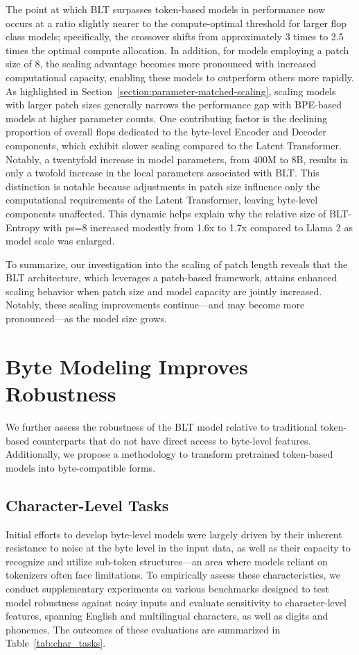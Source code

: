 The point at which {\textsc BLT} surpasses token-based models in performance now occurs at a ratio slightly nearer to the compute-optimal threshold for larger flop class models; specifically, the crossover shifts from approximately 3 times to 2.5 times the optimal compute allocation. In addition, for models employing a patch size of 8, the scaling advantage becomes more pronounced with increased computational capacity, enabling these models to outperform others more rapidly. As highlighted in Section~\ref{section:parameter-matched-scaling}, scaling models with larger patch sizes generally narrows the performance gap with BPE-based models at higher parameter counts. One contributing factor is the declining proportion of overall flops dedicated to the byte-level Encoder and Decoder components, which exhibit slower scaling compared to the Latent Transformer. Notably, a twentyfold increase in model parameters, from 400M to 8B, results in only a twofold increase in the local parameters associated with {\textsc BLT}. This distinction is notable because adjustments in patch size influence only the computational requirements of the Latent Transformer, leaving byte-level components unaffected. This dynamic helps explain why the relative size of {\textsc BLT}-Entropy with ps=8 increased modestly from 1.6x to 1.7x compared to Llama 2 as model scale was enlarged.

To summarize, our investigation into the scaling of patch length reveals that the {\textsc BLT} architecture, which leverages a patch-based framework, attains enhanced scaling behavior when patch size and model capacity are jointly increased. Notably, these scaling improvements continue—and may become more pronounced—as the model size grows.

\section{Byte Modeling Improves Robustness}
We further assess the robustness of the {\textsc BLT} model relative to traditional token-based counterparts that do not have direct access to byte-level features. Additionally, we propose a methodology to transform pretrained token-based models into byte-compatible forms.
\label{sec:robustness}

\subsection{Character-Level Tasks}

Initial efforts to develop byte-level models were largely driven by their inherent resistance to noise at the byte level in the input data, as well as their capacity to recognize and utilize sub-token structures—an area where models reliant on tokenizers often face limitations. To empirically assess these characteristics, we conduct supplementary experiments on various benchmarks designed to test model robustness against noisy inputs and evaluate sensitivity to character-level features, spanning English and multilingual characters, as well as digits and phonemes. The outcomes of these evaluations are summarized in Table~\ref{tab:char_tasks}.

